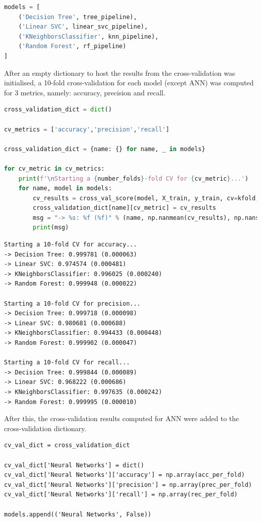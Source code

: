 \documentclass{article}
\begin{document}
\begin{lstlisting}[language=Python]
models = [    
    ('Decision Tree', tree_pipeline),
    ('Linear SVC', linear_svc_pipeline),
    ('KNeighborsClassifier', knn_pipeline),    
    ('Random Forest', rf_pipeline)
]
\end{lstlisting}

After an empty dictionary to host the results from the cross-validation was initialised, a 10-fold cross-validation for each model (except ANN) was computed for 3 metrics, namely: accuracy, precision and recall.

\begin{lstlisting}[language=Python]
cross_validation_dict = dict()

cv_metrics = ['accuracy','precision','recall']

cross_validation_dict = {name: {} for name, _ in models}

for cv_metric in cv_metrics:
    print(f'\nStarting a {number_folds}-fold CV for {cv_metric}...')
    for name, model in models:
        cv_results = cross_val_score(model, X_train, y_train, cv=kfold, scoring=cv_metric)
        cross_validation_dict[name][cv_metric] = cv_results
        msg = "-> %s: %f (%f)" % (name, np.nanmean(cv_results), np.nanstd(cv_results))        
        print(msg)   
\end{lstlisting}
\begin{verbatim}
Starting a 10-fold CV for accuracy...
-> Decision Tree: 0.999781 (0.000063)
-> Linear SVC: 0.974574 (0.000481)
-> KNeighborsClassifier: 0.996025 (0.000240)
-> Random Forest: 0.999948 (0.000022)

Starting a 10-fold CV for precision...
-> Decision Tree: 0.999718 (0.000098)
-> Linear SVC: 0.980681 (0.000688)
-> KNeighborsClassifier: 0.994433 (0.000448)
-> Random Forest: 0.999902 (0.000047)

Starting a 10-fold CV for recall...
-> Decision Tree: 0.999844 (0.000089)
-> Linear SVC: 0.968222 (0.000686)
-> KNeighborsClassifier: 0.997635 (0.000242)
-> Random Forest: 0.999995 (0.000010)
\end{verbatim}

After this, the cross-validation results computed for ANN were added to the cross-validation dictionary.

\begin{lstlisting}
cv_val_dict = cross_validation_dict

cv_val_dict['Neural Networks'] = dict()
cv_val_dict['Neural Networks']['accuracy'] = np.array(acc_per_fold)
cv_val_dict['Neural Networks']['precision'] = np.array(prec_per_fold)
cv_val_dict['Neural Networks']['recall'] = np.array(rec_per_fold)    

models.append(('Neural Networks', False))
\end{lstlisting}
\end{document}
